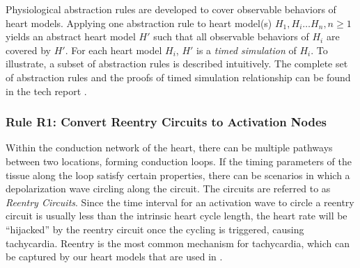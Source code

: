 Physiological abstraction rules are developed to cover observable behaviors of heart models.
Applying one abstraction rule to heart model(s) $H_1,H_i\dots H_n, n\geq 1$ yields an abstract heart model $H'$ such that all observable behaviors of $H_i$ are covered by $H'$.
For each heart model $H_i$, $H'$ is a \emph{timed simulation} of $H_i$.
To illustrate, a subset of abstraction rules is described intuitively.
The complete set of abstraction rules and the proofs of timed simulation relationship can be found in the tech report \cite{regar_tech}.

\subsubsection{Rule R1: Convert Reentry Circuits to Activation Nodes}
Within the conduction network of the heart, there can be multiple pathways between two locations, forming conduction loops. If the timing parameters of the tissue along the loop satisfy certain properties, there can be scenarios in which a depolarization wave circling along the circuit. 
The circuits are referred to as \emph{Reentry Circuits}. 
Since the time interval for an activation wave to circle a reentry circuit is usually less than the intrinsic heart cycle length, the heart rate will be "`hijacked"' by the reentry circuit once the cycling is triggered, causing tachycardia. 
Reentry is the most common mechanism for tachycardia, which can be captured by our heart models that are used in \cite{vhm_embc10}. 

